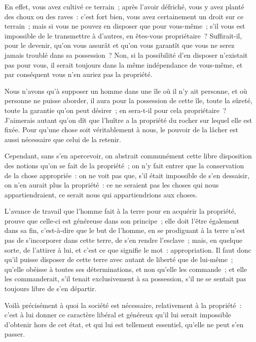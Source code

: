 \documentclass[french,twoside]{book} %
\begin{document}
En effet, vous avez cultivé ce terrain ; après l’avoir défriché, vous y avez planté des choux ou des raves : c’est fort bien, vous avez certainement un droit sur ce terrain ; mais si vous ne pouvez en disposer que pour vous-même ; s’il vous est impossible de le transmettre à d’autres, en êtes-vous propriétaire ? Suffirait-il, pour le devenir, qu’on vous assurât et qu’on vous garantît que vous ne serez jamais troublé dans sa possession ? Non, si la possibilité d’en disposer n’existait pas pour vous, il serait toujours dans la même indépendance de vous-même, et par conséquent vous n’en auriez pas la propriété.\par
Nous n’avons qu’à supposer un homme dans une île où il n’y ait personne, et où personne ne puisse aborder, il aura pour la possession de cette île, toute la sûreté, toute la garantie qu’on peut désirer ; en sera-t-il pour cela propriétaire ? J’aimerais autant qu’on dît que l’huître a la propriété du rocher sur lequel elle est fixée. Pour qu’une chose soit véritablement à nous, le pouvoir de la lâcher est aussi nécessaire que celui de la retenir.\par
Cependant, sans s’en apercevoir, on abstrait communément cette libre disposition des notions qu’on se fait de la propriété ; on n’y fait entrer que la conservation de la chose appropriée : on ne voit pas que, s’il était impossible de s’en dessaisir, on n’en aurait plus la propriété : ce ne seraient pas les choses qui nous appartiendraient, ce serait nous qui appartiendrions aux choses.\par
L’avance de travail que l’homme fait à la terre pour en acquérir la propriété, prouve que celle-ci est généreuse dans son principe ; elle doit l’être également dans sa fin, c’est-à-dire que le but de l’homme, en se prodiguant à la terre n’est pas de s’incorporer dans cette terre, de s’en rendre l’esclave ; mais, en quelque sorte, de l’attirer à lui, et c’est ce que signifie le mot : appropriation. Il faut donc qu’il puisse disposer de cette terre avec autant de liberté que de lui-même ; qu’elle obéisse à toutes ses déterminations, et non qu’elle les commande ; et elle les commanderait, s’il tenait exclusivement à sa possession, s’il ne se sentait pas toujours libre de s’en départir.\par
Voilà précisément à quoi la société est nécessaire, relativement à la propriété : c’est à lui donner ce caractère libéral et généreux qu’il lui serait impossible d’obtenir hors de cet état, et qui lui est tellement essentiel, qu’elle ne peut s’en passer.\par
\end{document}
